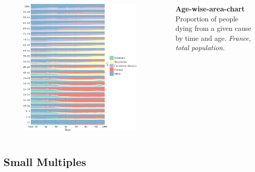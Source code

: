 \documentclass{beamer}
\begin{document}
\begin{frame}
\frametitle{\insertsection}

\begin{columns}[c]

\begin{figure}[htb!]
\includegraphics[width = 0.93\textwidth]{../fig/plot-agewise_area.pdf}
\end{figure}

\small \textbf{Age-wise-area-chart}\\ Proportion of people dying from a given cause by time and age. \scriptsize\emph{France, total population.}

\end{columns}

\end{frame}

%

\subsection{Small Multiples}
\end{document}
